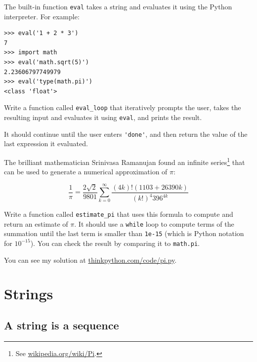\documentclass[10pt]{book}
\begin{document}
\begin{ex}


The built-in function {\tt eval} takes a string and evaluates
it using the Python interpreter.  For example:

\beforeverb
\begin{verbatim}
>>> eval('1 + 2 * 3')
7
>>> import math
>>> eval('math.sqrt(5)')
2.23606797749979
>>> eval('type(math.pi)')
<class 'float'>
\end{verbatim}
\afterverb
%
Write a function called \verb"eval_loop" that iteratively
prompts the user, takes the resulting input and evaluates
it using {\tt eval}, and prints the result.

It should continue until the user enters \verb"'done'", and then
return the value of the last expression it evaluated.

\end{ex}


\begin{ex}


The brilliant mathematician Srinivasa Ramanujan found an
infinite series\footnote{See \url{wikipedia.org/wiki/Pi}.}
that can be used to generate a numerical
approximation of $\pi$:


\[\frac{1}{\pi} = \frac{2\sqrt{2}}{9801} 
\sum^\infty_{k=0} \frac{(4k)!(1103+26390k)}{(k!)^4 396^{4k}} \]

Write a function called \verb"estimate_pi" that uses this formula
to compute and return an estimate of $\pi$.  It should use a {\tt while}
loop to compute terms of the summation until the last term is
smaller than {\tt 1e-15} (which is Python notation for $10^{-15}$).
You can check the result by comparing it to {\tt math.pi}.

You can see my solution at \url{thinkpython.com/code/pi.py}.
\end{ex}


\chapter{Strings}
\label{strings}


\section{A string is a sequence}
\end{document}

